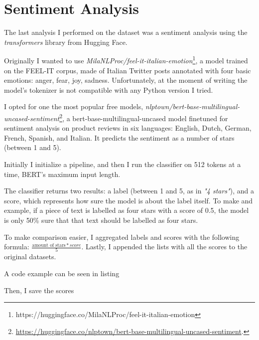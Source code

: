 \section{Sentiment Analysis}

The last analysis I performed on the dataset was a sentiment analysis using the \textit{transformers} library from Hugging Face.

Originally I wanted to use \textit{MilaNLProc/feel-it-italian-emotion}\footnote{https://huggingface.co/MilaNLProc/feel-it-italian-emotion}, a model trained on the FEEL-IT corpus, made of Italian Twitter posts annotated with four basic emotions: anger, fear, joy, sadness.
Unfortunately, at the moment of writing the model's tokenizer is not compatible with any Python version I tried. 

I opted for one the most popular free models, \textit{nlptown/bert-base-multilingual-uncased-sentiment}\footnote{\url{https://huggingface.co/nlptown/bert-base-multilingual-uncased-sentiment}.}, a bert-base-multilingual-uncased model finetuned for sentiment analysis on product reviews in six languages: English, Dutch, German, French, Spanish, and Italian. It predicts the sentiment as a number of stars (between 1 and 5).

Initially I initialize a pipeline, and then I run the classifier on 512 tokens at a time, BERT's maximum input length. 

The classifier returns two results: a label (between 1 and 5, as in \textit{"4 stars"}), and a score, which represents how sure the model is about the label itself. To make and example, if a piece of text is labelled as four stars with a score of 0.5, the model is only 50\% sure that that text should be labelled as four stars.

To make comparison easier, I aggregated labels and scores with the following formula: $\frac{\text{amount of stars}*score}{5}$. Lastly, I appended the lists with all the scores to the original datasets.

A code example can be seen in listing



Then, I save the scores
